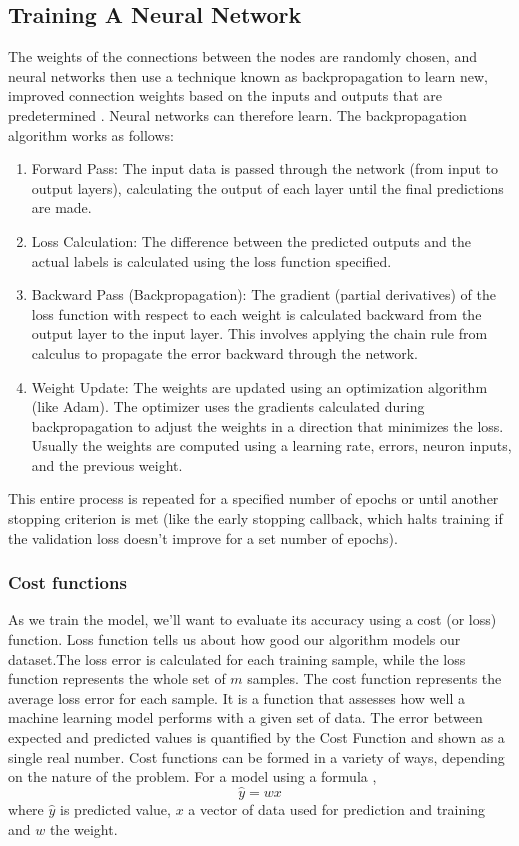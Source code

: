\subsection*{Training A Neural Network}
The weights of the connections between the nodes are randomly chosen, and neural networks then use a technique known as backpropagation to learn new, improved connection weights based on the inputs and outputs that are predetermined . Neural networks can therefore learn.
The backpropagation algorithm works as follows:
\begin{enumerate}[label=\arabic*.]
	\item Forward Pass: The input data is passed through the network (from input to output layers), calculating the output of each layer until the final predictions are made.
	\item Loss Calculation: The difference between the predicted outputs and the actual labels is calculated using the loss function specified.
	\item Backward Pass (Backpropagation): The gradient (partial derivatives) of the loss function with respect to each weight is calculated backward from the output layer to the input layer. This involves applying the chain rule from calculus to propagate the error backward through the network.
	\item Weight Update: The weights are updated using an optimization algorithm (like Adam). The optimizer uses the gradients calculated during backpropagation to adjust the weights in a direction that minimizes the loss. Usually the weights are computed using a learning rate, errors, neuron inputs, and the previous weight.
 \end{enumerate}
 This entire process is repeated for a specified number of epochs or until another stopping criterion is met (like the early stopping callback, which halts training if the validation loss doesn't improve for a set number of epochs).

\subsubsection*{Cost functions}
 As we train the model, we’ll want to evaluate its accuracy using a cost (or loss) function. Loss function tells us about how good our algorithm models our dataset.The loss error is calculated for each training sample, while the loss function represents the whole set of $m$ samples. The cost function represents the average loss error for each sample. It is a function that assesses how well a machine learning model performs with a given set of data. The error between expected and predicted values is quantified by the Cost Function and shown as a single real number. Cost functions can be formed in a variety of ways, depending on the nature of the problem. For a model using a formula ,
 \begin{equation*}
 	\hat{y} = wx
 \end{equation*} where $\hat{y}$ is predicted value, $x$ a vector of data used for prediction and training and $w$ the weight.
 
